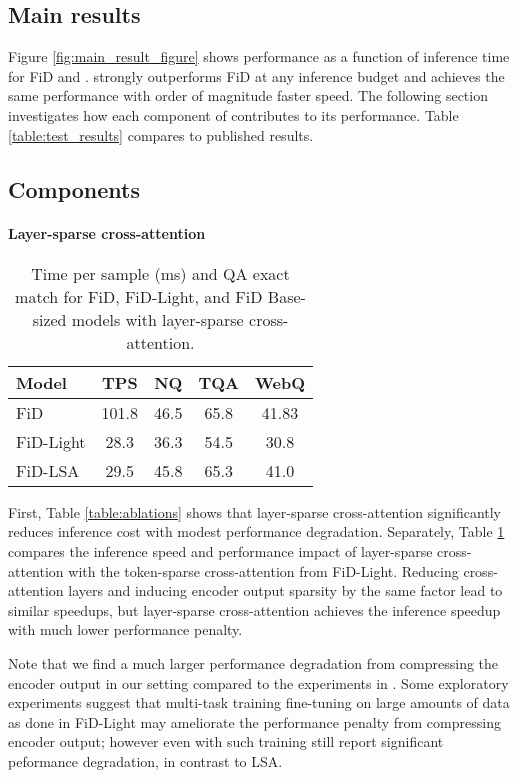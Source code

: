 \subsection{Main results}

Figure \ref{fig:main_result_figure} shows performance as a function of inference time for FiD and \modelname. \modelname strongly outperforms FiD at any inference budget and achieves the same performance with order of magnitude faster speed. The following section investigates how each component of \modelname contributes to its performance. Table \ref{table:test_results} compares \modelname to published results.

\subsection{Components}

\paragraph{Layer-sparse cross-attention}
\begin{table}[ht!]
\centering
\begin{tabular}{lc|ccc}
    \textbf{Model} & \textbf{TPS} & \textbf{NQ} & \textbf{TQA} & \textbf{WebQ} \\
    \toprule
    FiD & 101.8 & 46.5 & 65.8 & 41.83 \\
    FiD-Light & 28.3 & 36.3 & 54.5 & 30.8 \\
    FiD-LSA & 29.5 & 45.8 & 65.3 & 41.0 \\
    \bottomrule
\end{tabular}
\caption{Time per sample (ms) and QA exact match for FiD, FiD-Light, and FiD Base-sized models with layer-sparse cross-attention.}
\label{table:layersparse_vs_light}
\end{table} 
First, Table \ref{table:ablations} shows that layer-sparse cross-attention significantly reduces inference cost with modest performance degradation. Separately, Table \ref{table:layersparse_vs_light} compares the inference speed and performance impact of layer-sparse cross-attention with the token-sparse cross-attention from FiD-Light. Reducing cross-attention layers and inducing encoder output sparsity by the same factor lead to similar speedups, but layer-sparse cross-attention achieves the inference speedup with much lower performance penalty. 

Note that we find a much larger performance degradation from compressing the encoder output in our setting compared to the experiments in \citet{fidlight}. Some exploratory experiments suggest that multi-task training fine-tuning on large amounts of data as done in FiD-Light may ameliorate the performance penalty from compressing encoder output; however even with such training \citet{fidlight} still report significant peformance degradation, in contrast to LSA.


